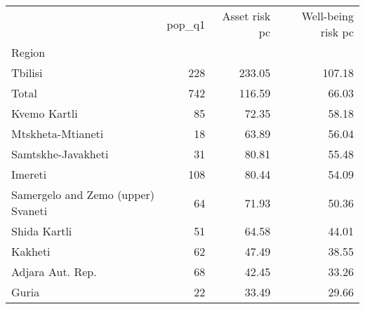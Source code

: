 \begin{tabular}{lrrr}
\toprule
{} &  pop\_q1 &  Asset risk pc &  Well-being risk pc \\
Region                             &         &                &                     \\
\midrule
Tbilisi                            &     228 &         233.05 &              107.18 \\
Total                              &     742 &         116.59 &               66.03 \\
Kvemo Kartli                       &      85 &          72.35 &               58.18 \\
Mtskheta-Mtianeti                  &      18 &          63.89 &               56.04 \\
Samtskhe-Javakheti                 &      31 &          80.81 &               55.48 \\
Imereti                            &     108 &          80.44 &               54.09 \\
Samergelo and Zemo (upper) Svaneti &      64 &          71.93 &               50.36 \\
Shida Kartli                       &      51 &          64.58 &               44.01 \\
Kakheti                            &      62 &          47.49 &               38.55 \\
Adjara Aut. Rep.                   &      68 &          42.45 &               33.26 \\
Guria                              &      22 &          33.49 &               29.66 \\
\bottomrule
\end{tabular}
